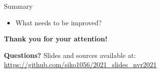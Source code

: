 \begin{frame}{Summary}
\begin{itemize}
\item
What needs to be improved?
\end{itemize}
\end{frame}


\begin{frame}
\begin{center}
\textbf{\Large Thank you for your attention!}

\bigskip

\bigskip

\textbf{\Large Questions?}
\vfill\footnotesize
Slides and sources available at:
{\color{DarkBlue}\url{https://github.com/siko1056/2021_slides_nvr2021}}
\end{center}
\end{frame}
